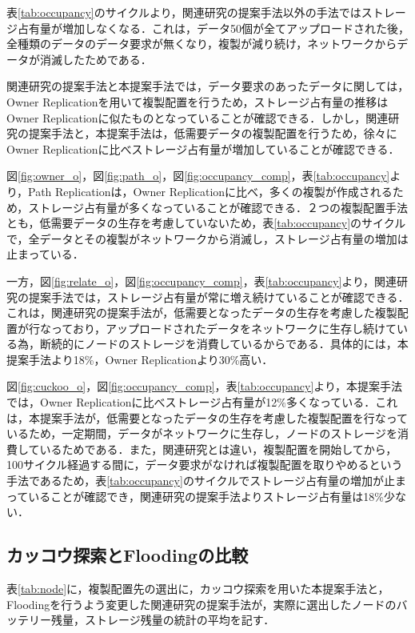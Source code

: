 \documentclass[11pt]{jreport}
\begin{document}
\newpage
\par 表\ref{tab:occupancy}のサイクルより，関連研究の提案手法以外の手法ではストレージ占有量が増加しなくなる．これは，データ50個が全てアップロードされた後，全種類のデータのデータ要求が無くなり，複製が減り続け，ネットワークからデータが消滅したためである．
\par 関連研究の提案手法と本提案手法では，データ要求のあったデータに関しては，Owner Replicationを用いて複製配置を行うため，ストレージ占有量の推移はOwner Replicationに似たものとなっていることが確認できる．しかし，関連研究の提案手法と，本提案手法は，低需要データの複製配置を行うため，徐々にOwner Replicationに比べストレージ占有量が増加していることが確認できる．
\par 図\ref{fig:owner_o}，図\ref{fig:path_o}，図\ref{fig:occupancy_comp}，表\ref{tab:occupancy}より，Path Replicationは，Owner Replicationに比べ，多くの複製が作成されるため，ストレージ占有量が多くなっていることが確認できる．２つの複製配置手法とも，低需要データの生存を考慮していないため，表\ref{tab:occupancy}のサイクルで，全データとその複製がネットワークから消滅し，ストレージ占有量の増加は止まっている．
\par 一方，図\ref{fig:relate_o}，図\ref{fig:occupancy_comp}，表\ref{tab:occupancy}より，関連研究の提案手法では，ストレージ占有量が常に増え続けていることが確認できる．これは，関連研究の提案手法が，低需要となったデータの生存を考慮した複製配置が行なっており，アップロードされたデータをネットワークに生存し続けている為，断続的にノードのストレージを消費しているからである．具体的には，本提案手法より18\%，Owner Replicationより30\%高い．
\par 図\ref{fig:cuckoo_o}，図\ref{fig:occupancy_comp}，表\ref{tab:occupancy}より，本提案手法では，Owner Replicationに比べストレージ占有量が12\%多くなっている．これは，本提案手法が，低需要となったデータの生存を考慮した複製配置を行なっているため，一定期間，データがネットワークに生存し，ノードのストレージを消費しているためである．また，関連研究とは違い，複製配置を開始してから，100サイクル経過する間に，データ要求がなければ複製配置を取りやめるという手法であるため，表\ref{tab:occupancy}のサイクルでストレージ占有量の増加が止まっていることが確認でき，関連研究の提案手法よりストレージ占有量は18\%少ない．

\newpage
\newpage
\subsection{カッコウ探索とFloodingの比較}
表\ref{tab:node}に，複製配置先の選出に，カッコウ探索を用いた本提案手法と，Floodingを行うよう変更した関連研究の提案手法が，実際に選出したノードのバッテリー残量，ストレージ残量の統計の平均を記す．
\end{document}
